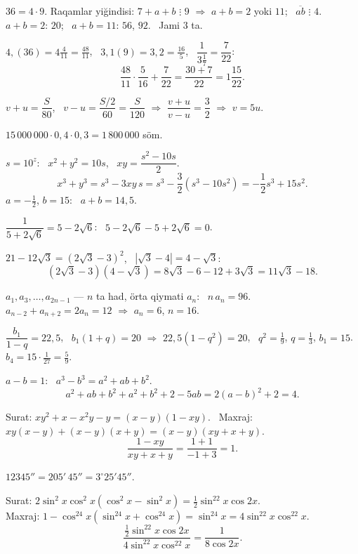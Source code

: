 




$36=4\cdot9$. Raqamlar yiğindisi: $7+a+b$ $\vdots$ $9$ $\Rightarrow$ $a+b=2$ yoki $11$; \ $\overline{ab}$ $\vdots$ $4$.\\
$a+b=2$: $20$; \ $a+b=11$: $56$, $92$. \ Jami $3$ ta.

$4{,}(36)=4\frac4{11}=\frac{48}{11}$, \ $3{,}1(9)=3{,}2=\frac{16}5$, \ $\dfrac1{3\frac17}=\dfrac7{22}$:
\[\frac{48}{11}\cdot\frac5{16}+\frac7{22}=\frac{30+7}{22}=1\frac{15}{22}.\]

$v+u=\dfrac S{80}$, \ $v-u=\dfrac{S/2}{60}=\dfrac S{120}$ $\Rightarrow$ $\dfrac{v+u}{v-u}=\dfrac32$ $\Rightarrow$ $v=5u$.

$15\,000\,000\cdot0{,}4\cdot0{,}3=1\,800\,000$ söm.

$s=10^z$: \ $x^2+y^2=10s$, \ $xy=\dfrac{s^2-10s}2$.
\[x^3+y^3=s^3-3xy\,s=s^3-\frac32\left(s^3-10s^2\right)=-\frac12s^3+15s^2.\]
$a=-\frac12$, $b=15$: \ $a+b=14{,}5$.

$\dfrac1{5+2\sqrt6}=5-2\sqrt6$: \ $5-2\sqrt6-5+2\sqrt6=0$.

$21-12\sqrt3=\left(2\sqrt3-3\right)^2$, \ $\left|\sqrt3-4\right|=4-\sqrt3$:
\[\left(2\sqrt3-3\right)\left(4-\sqrt3\right)=8\sqrt3-6-12+3\sqrt3=11\sqrt3-18.\]

$a_1,a_3,\dots,a_{2n-1}$ — $n$ ta had, örta qiymati $a_n$: \ $n\,a_n=96$. \ $a_{n-2}+a_{n+2}=2a_n=12$ $\Rightarrow$ $a_n=6$, $n=16$.

$\dfrac{b_1}{1-q}=22{,}5$, \ $b_1(1+q)=20$ $\Rightarrow$ $22{,}5\left(1-q^2\right)=20$, \ $q^2=\frac19$, $q=\frac13$, $b_1=15$.\\
$b_4=15\cdot\frac1{27}=\frac59$.

$a-b=1$: \ $a^3-b^3=a^2+ab+b^2$.
\[a^2+ab+b^2+a^2+b^2+2-5ab=2(a-b)^2+2=4.\]

Surat: $xy^2+x-x^2y-y=(x-y)(1-xy)$. \ Maxraj: $xy(x-y)+(x-y)(x+y)=(x-y)(xy+x+y)$.
\[\frac{1-xy}{xy+x+y}=\frac{1+1}{-1+3}=1.\]

$12345''=205'\,45''=3^\circ25'45''$.

Surat: $2\sin^2x\cos^2x\left(\cos^2x-\sin^2x\right)=\frac12\sin^22x\cos2x$.\\
Maxraj: $1-\cos^24x\left(\sin^24x+\cos^24x\right)=\sin^24x=4\sin^22x\cos^22x$.
\[\frac{\frac12\sin^22x\cos2x}{4\sin^22x\cos^22x}=\frac1{8\cos2x}.\]

